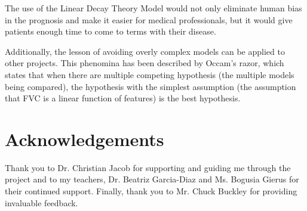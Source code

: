 \documentclass[12pt]{article}
\begin{document}

The use of the Linear Decay Theory Model would not only eliminate human bias in the prognosis and make it easier for medical professionals, but it would give patients enough time to come to terms with their disease. %

Additionally, the lesson of avoiding overly complex models can be applied to other projects. %
This phenomina has been described by Occam's razor, which states that when there are multiple competing hypothesis (the multiple models being compared), the hypothesis with the simplest assumption (the assumption that FVC is a linear function of features) is the best hypothesis.

\section{Acknowledgements}

Thank you to Dr. Christian Jacob for supporting and guiding me through the project and to my teachers, Dr. Beatriz Garcia-Diaz and Ms. Bogusia Gierus for their continued support.
Finally, thank you to Mr. Chuck Buckley for providing invaluable feedback.

\printbibliography
\end{document}
